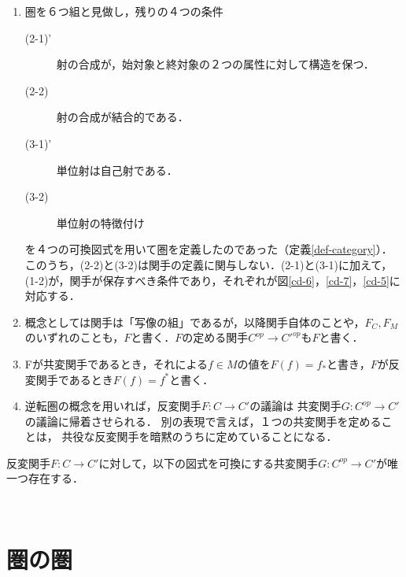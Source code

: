 \documentclass[uplatex, dvipdfmx]{jsreport}
\begin{document}
\begin{remark}\mbox{}
    \begin{enumerate}
        \item 圏を６つ組と見做し，残りの４つの条件
        \begin{description}
            \item[(2-1)'] 射の合成が，始対象と終対象の２つの属性に対して構造を保つ．
            \item[(2-2)] 射の合成が結合的である．
            \item[(3-1)'] 単位射は自己射である．
            \item[(3-2)] 単位射の特徴付け
        \end{description}
        を４つの可換図式を用いて圏を定義したのであった（定義\ref{def-category}）．このうち，(2-2)と(3-2)は関手の定義に関与しない．(2-1)と(3-1)に加えて，(1-2)が，関手が保存すべき条件であり，それぞれが図\ref{cd-6}，\ref{cd-7}，\ref{cd-5}に対応する．
        \item 概念としては関手は「写像の組」であるが，以降関手自体のことや，$F_C,F_M$のいずれのことも，$F$と書く．$F$の定める関手$C^{op}\to C'^{op}$も$F$と書く．
        \item Fが共変関手であるとき，それによる$f\in M$の値を$F(f)=f_*$と書き，$F$が反変関手であるとき$F(f)=f^*$と書く．
        \item 逆転圏の概念を用いれば，反変関手$F:C\rightarrow C'$の議論は
        共変関手$G:C^{op}\rightarrow C'$の議論に帰着させられる．
        別の表現で言えば，１つの共変関手を定めることは，
        共役な反変関手を暗黙のうちに定めていることになる．
    \end{enumerate}
\end{remark}
\begin{proposition}[反変関手に対応する共変関手]
    反変関手$F:C\rightarrow C'$に対して，以下の図式を可換にする共変関手$G:C^{op}\rightarrow C'$が唯一つ存在する．
    \begin{center}  \end{center}
\end{proposition}

\section{圏の圏}
\end{document}
